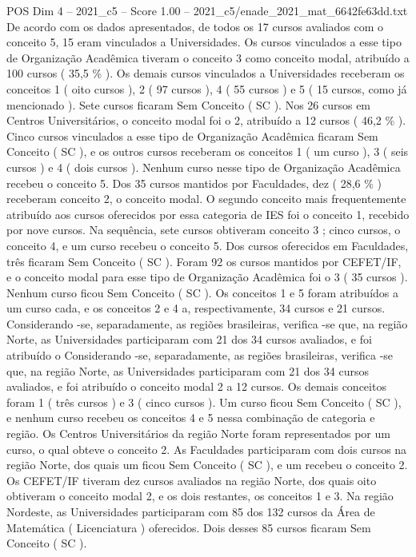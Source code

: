 \begin{textsample}{POS Dim 4 – 2021\_c5 – Score 1.00 – 2021\_c5/enade\_2021\_mat\_6642fe63dd.txt}
De acordo com os dados apresentados, de todos os 17 cursos avaliados com o conceito 5, 15 eram vinculados a Universidades.
Os cursos vinculados a esse tipo de Organização Acadêmica tiveram o conceito 3 como conceito modal, atribuído a 100 cursos ( 35,5 \% ).
Os demais cursos vinculados a Universidades receberam os conceitos 1 ( oito cursos ), 2 ( 97 cursos ), 4 ( 55 cursos ) e 5 ( 15 cursos, como já mencionado ).
Sete cursos ficaram Sem Conceito ( SC ).
Nos 26 cursos em Centros Universitários, o conceito modal foi o 2, atribuído a 12 cursos ( 46,2 \% ).
Cinco cursos vinculados a esse tipo de Organização Acadêmica ficaram Sem Conceito ( SC ), e os outros cursos receberam os conceitos 1 ( um curso ), 3 ( seis cursos ) e 4 ( dois cursos ).
Nenhum curso nesse tipo de Organização Acadêmica recebeu o conceito 5.
Dos 35 cursos mantidos por Faculdades, dez ( 28,6 \% ) receberam conceito 2, o conceito modal.
O segundo conceito mais frequentemente atribuído aos cursos oferecidos por essa categoria de IES foi o conceito 1, recebido por nove cursos.
Na sequência, sete cursos obtiveram conceito 3 ; cinco cursos, o conceito 4, e um curso recebeu o conceito 5.
Dos cursos oferecidos em Faculdades, três ficaram Sem Conceito ( SC ).
Foram 92 os cursos mantidos por CEFET/IF, e o conceito modal para esse tipo de Organização Acadêmica foi o 3 ( 35 cursos ).
Nenhum curso ficou Sem Conceito ( SC ).
Os conceitos 1 e 5 foram atribuídos a um curso cada, e os conceitos 2 e 4 a, respectivamente, 34 cursos e 21 cursos.
Considerando -se, separadamente, as regiões brasileiras, verifica -se que, na região Norte, as Universidades participaram com 21 dos 34 cursos avaliados, e foi atribuído o Considerando -se, separadamente, as regiões brasileiras, verifica -se que, na região Norte, as Universidades participaram com 21 dos 34 cursos avaliados, e foi atribuído o conceito modal 2 a 12 cursos.
Os demais conceitos foram 1 ( três cursos ) e 3 ( cinco cursos ).
Um curso ficou Sem Conceito ( SC ), e nenhum curso recebeu os conceitos 4 e 5 nessa combinação de categoria e região.
Os Centros Universitários da região Norte foram representados por um curso, o qual obteve o conceito 2.
As Faculdades participaram com dois cursos na região Norte, dos quais um ficou Sem Conceito ( SC ), e um recebeu o conceito 2.
Os CEFET/IF tiveram dez cursos avaliados na região Norte, dos quais oito obtiveram o conceito modal 2, e os dois restantes, os conceitos 1 e 3.
Na região Nordeste, as Universidades participaram com 85 dos 132 cursos da Área de Matemática ( Licenciatura ) oferecidos.
Dois desses 85 cursos ficaram Sem Conceito ( SC ).

\end{textsample}
